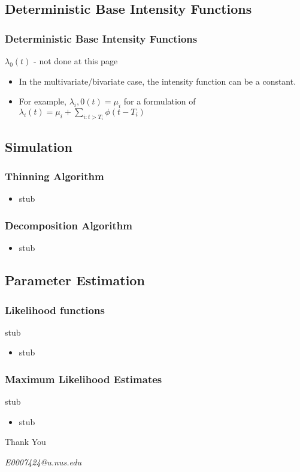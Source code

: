 \documentclass{beamer}
\begin{document}
\subsection{Deterministic Base Intensity Functions}

\begin{frame}
\frametitle{Deterministic Base Intensity Functions}
$\lambda_0(t)$ - not done at this page
\begin{itemize}
	\item In the multivariate/bivariate case, the intensity function can be a constant.
	\item For example, $\lambda_i,0(t) = \mu_i$ for a formulation of $\lambda_i(t) = \mu_i + \sum_{i: t > T_i} \phi(t - T_i)$
\end{itemize}
\end{frame}

\subsection{Simulation}

\begin{frame}
\frametitle{Thinning Algorithm}
\begin{itemize}
	\item stub
\end{itemize}
\end{frame}

\begin{frame}
\frametitle{Decomposition Algorithm}
\begin{itemize}
	\item stub
\end{itemize}
\end{frame}

\subsection{Parameter Estimation}
\begin{frame}
\frametitle{Likelihood functions}
stub
\begin{itemize}
	\item stub
\end{itemize}
\end{frame}

\begin{frame}
\frametitle{Maximum Likelihood Estimates}
stub
\begin{itemize}
	\item stub
\end{itemize}
\end{frame}

\begin{frame}
\Huge{\centerline{Thank You}}
\begin{center}
\begin{normalsize}
\emph{E0007424@u.nus.edu}
\end{normalsize}
\end{center}
\end{frame}


\end{document}
